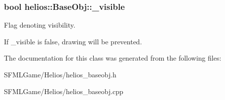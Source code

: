 \subsubsection[{\+\_\+visible}]{\setlength{\rightskip}{0pt plus 5cm}bool helios\+::\+Base\+Obj\+::\+\_\+visible\hspace{0.3cm}{\ttfamily [protected]}}\label{classhelios_1_1_base_obj_ab614fbf556382cdfb8c09fc0215db281}


Flag denoting visibility. 

If \+\_\+visible is false, drawing will be prevented. 

The documentation for this class was generated from the following files\+:\begin{DoxyCompactItemize}
\item 
S\+F\+M\+L\+Game/\+Helios/helios\+\_\+baseobj.\+h\item 
S\+F\+M\+L\+Game/\+Helios/helios\+\_\+baseobj.\+cpp\end{DoxyCompactItemize}

